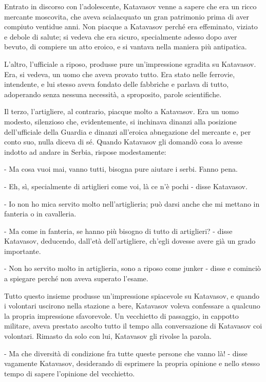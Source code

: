 Entrato in discorso con l'adolescente, Katavasov venne a sapere che era un ricco mercante moscovita, che aveva scialacquato un gran patrimonio prima di aver compiuto ventidue anni. Non piacque a Katavasov perché era effeminato, viziato e debole di salute; si vedeva che era sicuro, specialmente adesso dopo aver bevuto, di compiere un atto eroico, e si vantava nella maniera più antipatica. 

L'altro, l'ufficiale a riposo, produsse pure un'impressione sgradita su Katavasov. Era, si vedeva, un uomo che aveva provato tutto. Era stato nelle ferrovie, intendente, e lui stesso aveva fondato delle fabbriche e parlava di tutto, adoperando senza nessuna necessità, a sproposito, parole scientifiche. 

Il terzo, l'artigliere, al contrario, piacque molto a Katavasov. Era un uomo modesto, silenzioso che, evidentemente, si inchinava dinanzi alla posizione dell'ufficiale della Guardia e dinanzi all'eroica abnegazione del mercante e, per conto suo, nulla diceva di sé. Quando Katavasov gli domandò cosa lo avesse indotto ad andare in Serbia, rispose modestamente: 

- Ma cosa vuoi mai, vanno tutti, bisogna pure aiutare i serbi. Fanno pena. 

- Eh, sì, specialmente di artiglieri come voi, là ce n'è pochi - disse Katavasov. 

- Io non ho mica servito molto nell'artiglieria; può darsi anche che mi mettano in fanteria o in cavalleria. 

- Ma come in fanteria, se hanno più bisogno di tutto di artiglieri? - disse Katavasov, deducendo, dall'età dell'artigliere, ch'egli dovesse avere già un grado importante. 

- Non ho servito molto in artiglieria, sono a riposo come junker - disse e cominciò a spiegare perché non aveva superato l'esame. 

Tutto questo insieme produsse un'impressione spiacevole su Katavasov, e quando i volontari uscirono nella stazione a bere, Katavasov voleva confessare a qualcuno la propria impressione sfavorevole. Un vecchietto di passaggio, in cappotto militare, aveva prestato ascolto tutto il tempo alla conversazione di Katavasov coi volontari. Rimasto da solo con lui, Katavasov gli rivolse la parola. 

- Ma che diversità di condizione fra tutte queste persone che vanno là! - disse vagamente Katavasov, desiderando di esprimere la propria opinione e nello stesso tempo di sapere l'opinione del vecchietto. 

